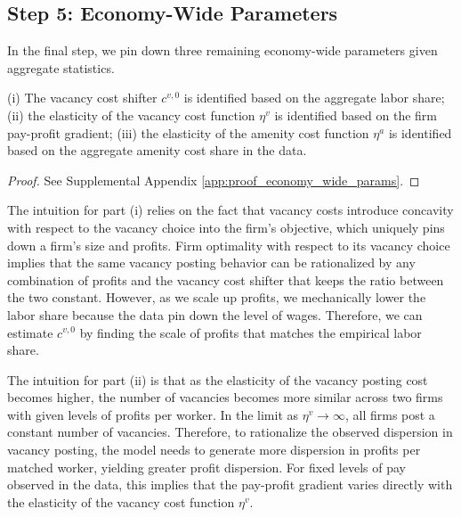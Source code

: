 \subsection{Step 5: Economy-Wide Parameters\label{subsec:identification_economy_wide}}

In the final step, we pin down three remaining economy-wide parameters given aggregate statistics.

%
\newcommand{\PropEconomyWideParameters}{%
    (i) The vacancy cost shifter $c^{v,0}$ is identified based on the aggregate labor share; (ii) the elasticity of the vacancy cost function $\eta^{v}$ is identified based on the firm pay-profit gradient; (iii) the elasticity of the amenity cost function $\eta^{a}$ is identified based on the aggregate amenity cost share in the data.%
}
%
\begin{proposition}
    \label{prop:economy_wide_params}
    \PropEconomyWideParameters
\end{proposition}
%
\begin{proof}
    See Supplemental Appendix \ref{app:proof_economy_wide_params}.
\end{proof}

The intuition for part (i) relies on the fact that vacancy costs introduce concavity with respect to the vacancy choice into the firm's objective, which uniquely pins down a firm's size and profits. Firm optimality with respect to its vacancy choice implies that the same vacancy posting behavior can be rationalized by any combination of profits and the vacancy cost shifter that keeps the ratio between the two constant. However, as we scale up profits, we mechanically lower the labor share because the data pin down the level of wages. Therefore, we can estimate $c^{v,0}$ by finding the scale of profits that matches the empirical labor share.

The intuition for part (ii) is that as the elasticity of the vacancy posting cost becomes higher, the number of vacancies becomes more similar across two firms with given levels of profits per worker. In the limit as $\eta^{v} \rightarrow \infty$, all firms post a constant number of vacancies. Therefore, to rationalize the observed dispersion in vacancy posting, the model needs to generate more dispersion in profits per matched worker, yielding greater profit dispersion. For fixed levels of pay observed in the data, this implies that the pay-profit gradient varies directly with the elasticity of the vacancy cost function $\eta^{v}$.

